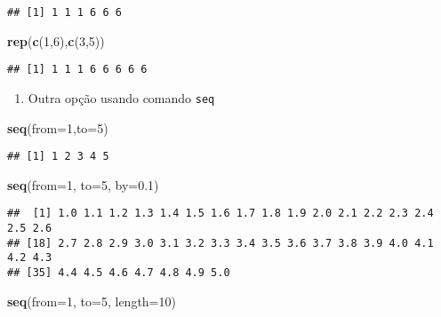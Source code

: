 \documentclass[]{article}
\newenvironment{Shaded}{\begin{snugshade}}{\end{snugshade}}
\newcommand{\KeywordTok}[1]{\textcolor[rgb]{0.13,0.29,0.53}{\textbf{#1}}}
\newcommand{\DataTypeTok}[1]{\textcolor[rgb]{0.13,0.29,0.53}{#1}}
\newcommand{\DecValTok}[1]{\textcolor[rgb]{0.00,0.00,0.81}{#1}}
\newcommand{\FloatTok}[1]{\textcolor[rgb]{0.00,0.00,0.81}{#1}}
\newcommand{\NormalTok}[1]{#1}
\providecommand{\tightlist}{%
  \setlength{\itemsep}{0pt}\setlength{\parskip}{0pt}}
\begin{document}
\begin{verbatim}
## [1] 1 1 1 6 6 6
\end{verbatim}

\begin{Shaded}
\begin{Highlighting}[]
\KeywordTok{rep}\NormalTok{(}\KeywordTok{c}\NormalTok{(}\DecValTok{1}\NormalTok{,}\DecValTok{6}\NormalTok{),}\KeywordTok{c}\NormalTok{(}\DecValTok{3}\NormalTok{,}\DecValTok{5}\NormalTok{))}
\end{Highlighting}
\end{Shaded}

\begin{verbatim}
## [1] 1 1 1 6 6 6 6 6
\end{verbatim}

\begin{enumerate}
\def\labelenumi{\arabic{enumi}.}
\setcounter{enumi}{3}
\tightlist
\item
  Outra opção usando comando \texttt{seq}
\end{enumerate}

\begin{Shaded}
\begin{Highlighting}[]
\KeywordTok{seq}\NormalTok{(}\DataTypeTok{from=}\DecValTok{1}\NormalTok{,}\DataTypeTok{to=}\DecValTok{5}\NormalTok{)}
\end{Highlighting}
\end{Shaded}

\begin{verbatim}
## [1] 1 2 3 4 5
\end{verbatim}

\begin{Shaded}
\begin{Highlighting}[]
\KeywordTok{seq}\NormalTok{(}\DataTypeTok{from=}\DecValTok{1}\NormalTok{, }\DataTypeTok{to=}\DecValTok{5}\NormalTok{, }\DataTypeTok{by=}\FloatTok{0.1}\NormalTok{)}
\end{Highlighting}
\end{Shaded}

\begin{verbatim}
##  [1] 1.0 1.1 1.2 1.3 1.4 1.5 1.6 1.7 1.8 1.9 2.0 2.1 2.2 2.3 2.4 2.5 2.6
## [18] 2.7 2.8 2.9 3.0 3.1 3.2 3.3 3.4 3.5 3.6 3.7 3.8 3.9 4.0 4.1 4.2 4.3
## [35] 4.4 4.5 4.6 4.7 4.8 4.9 5.0
\end{verbatim}

\begin{Shaded}
\begin{Highlighting}[]
\KeywordTok{seq}\NormalTok{(}\DataTypeTok{from=}\DecValTok{1}\NormalTok{, }\DataTypeTok{to=}\DecValTok{5}\NormalTok{, }\DataTypeTok{length=}\DecValTok{10}\NormalTok{)}
\end{Highlighting}
\end{Shaded}
\end{document}
